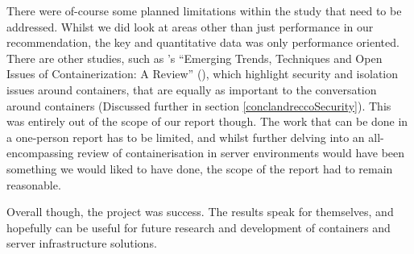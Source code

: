 There were of-course some planned limitations within the study that need to be addressed. Whilst we did look at areas other than just performance in our recommendation, the key and quantitative data was only performance oriented. There are other studies, such as \citeauthor{watanda19}'s “Emerging Trends, Techniques and Open Issues of Containerization: A Review” (\citeyear{watanda19}), which highlight security and isolation issues around containers, that are equally as important to the conversation around containers (Discussed further in section \ref{conclandreccoSecurity}). This was entirely out of the scope of our report though. The work that can be done in a one-person report has to be limited, and whilst further delving into an all-encompassing review of containerisation in server environments would have been something we would liked to have done, the scope of the report had to remain reasonable.

Overall though, the project was success. The results speak for themselves, and hopefully can be useful for future research and development of containers and server infrastructure solutions.


